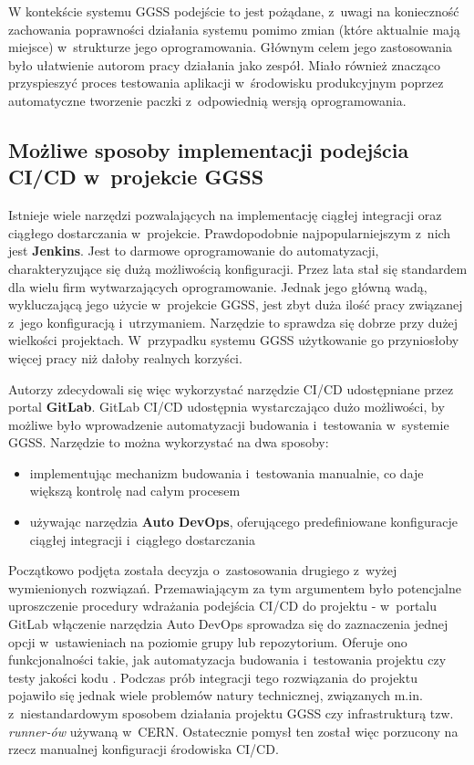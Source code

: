 W kontekście systemu GGSS podejście to jest pożądane, z~uwagi na konieczność zachowania poprawności działania systemu pomimo zmian (które aktualnie mają miejsce) w~strukturze jego oprogramowania. Głównym celem jego zastosowania było ułatwienie autorom pracy działania jako zespół. Miało również znacząco przyspieszyć proces testowania aplikacji w~środowisku produkcyjnym poprzez automatyczne tworzenie paczki z~odpowiednią wersją oprogramowania.

\subsection{Możliwe sposoby implementacji podejścia CI/CD w~projekcie GGSS}
Istnieje wiele narzędzi pozwalających na implementację ciągłej integracji oraz ciągłego dostarczania w~projekcie. Prawdopodobnie najpopularniejszym z~nich jest \textbf{Jenkins}. Jest to darmowe \cite{JenkinsWiki} oprogramowanie do automatyzacji, charakteryzujące się dużą możliwością konfiguracji. Przez lata stał się standardem dla wielu firm wytwarzających oprogramowanie. Jednak jego główną wadą, wykluczającą jego użycie w~projekcie GGSS, jest zbyt duża ilość pracy związanej z~jego konfiguracją i~utrzymaniem. Narzędzie to sprawdza się dobrze przy dużej wielkości projektach. W~przypadku systemu GGSS użytkowanie go przyniosłoby więcej pracy niż dałoby realnych korzyści. 

Autorzy zdecydowali się więc wykorzystać narzędzie CI/CD udostępniane przez portal \textbf{GitLab}. GitLab CI/CD udostępnia wystarczająco dużo możliwości, by możliwe było wprowadzenie automatyzacji budowania i~testowania w~systemie GGSS. Narzędzie to można wykorzystać na dwa sposoby:
\begin{itemize}
\item implementując mechanizm budowania i~testowania manualnie, co daje większą kontrolę nad całym procesem
\item używając narzędzia \textbf{Auto DevOps}, oferującego predefiniowane konfiguracje ciągłej integracji i~ciągłego dostarczania
\end{itemize}
Początkowo podjęta została decyzja o~zastosowania drugiego z~wyżej wymienionych rozwiązań. Przemawiającym za tym argumentem było potencjalne uproszczenie procedury wdrażania podejścia CI/CD do projektu - w~portalu GitLab włączenie narzędzia Auto DevOps sprowadza się do zaznaczenia jednej opcji w~ustawieniach na poziomie grupy lub repozytorium. Oferuje ono funkcjonalności takie, jak automatyzacja budowania i~testowania projektu czy testy jakości kodu \cite{AutoDevOpsPage}. Podczas prób integracji tego rozwiązania do projektu pojawiło się jednak wiele problemów natury technicznej, związanych m.in. z~niestandardowym sposobem działania projektu GGSS czy infrastrukturą tzw. \textit{runner-ów} używaną w~CERN. Ostatecznie pomysł ten został więc porzucony na rzecz manualnej konfiguracji środowiska CI/CD. 

